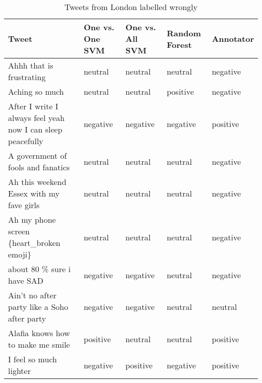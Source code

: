 \begin{table}[ht]
	\caption{Tweets from London labelled wrongly}
	\begin{tabular}{|p{5cm}|p{1.8cm}|p{1.8cm}|p{1.8cm}|p{1.8cm}|} \hline
	Tweet & One vs. One SVM &One vs. All SVM &Random Forest & Annotator\\ \hline
	Ahhh that is frustrating & neutral & neutral & neutral & negative\\ \hline
	Aching so much & neutral& neutral& positive & negative\\ \hline
	After I write I always feel yeah now I can sleep peacefully &negative&negative&negative&positive \\ \hline
	A government of fools and fanatics & neutral& neutral& neutral& negative \\ \hline
	Ah this weekend Essex with my fave girls & neutral& neutral& neutral& negative \\ \hline

	Ah my phone screen \{heart\_broken emoji\} & neutral & neutral& neutral& negative \\ \hline
	about 80 \% sure i have SAD & negative & negative & neutral & negative\\ \hline
	Ain't no after party like a Soho after party & negative & negative & neutral & neutral \\ \hline
	Alafia knows how to make me smile & positive & neutral & neutral & positive \\ \hline
	I feel so much lighter & negative & positive & negative & positive \\ \hline

	\end{tabular}
	\label{tab:wrong_tweets_en}
\end{table}
\clearpage

